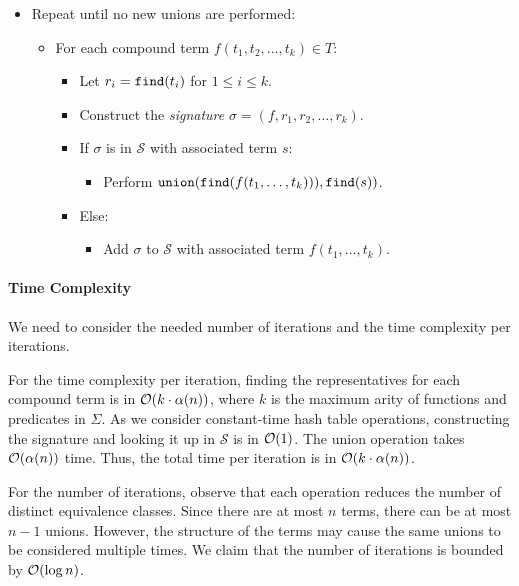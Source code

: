 \begin{itemize} \item Repeat until no new unions are performed:
  \begin{itemize} \item For each compound term $f(t_1, t_2, \dots, t_k) \in T$:
    \begin{itemize}
      \item Let $r_i = \mbox{\texttt{find}}(t_i)$ for $1 \leq i \leq k$.
      \item Construct the \emph{signature} $\sigma = (f, r_1, r_2, \dots, r_k)$.
      \item If $\sigma$ is in $\mathcal{S}$ with associated term $s$:
      \begin{itemize}
        \item Perform $\mbox{\texttt{union}}(\mbox{\texttt{find}}(f(t_1, \dots, t_k))),
        \mbox{\texttt{find}}(s))$.
      \end{itemize}
      \item Else:
      \begin{itemize}
        \item Add $\sigma$ to $\mathcal{S}$ with associated term $f(t_1, \dots, t_k)$.
      \end{itemize}
    \end{itemize}
  \end{itemize}
\end{itemize}

\paragraph{Time Complexity} We need to consider the needed number of iterations and the time complexity per iterations.

For the time complexity per iteration, finding the representatives for each
compound term is in $\mathcal{O}(k \cdot \alpha(n))$, where $k$ is the maximum arity
of functions and predicates in $\Sigma$. As we consider constant-time hash table operations,
constructing the signature and looking it up in $\mathcal{S}$ is in $\mathcal{O}(1)$. The union operation
takes $\mathcal{O}(\alpha(n))$ time. Thus, the total time per iteration is in $\mathcal{O}(k \cdot \alpha(n))$.

For the number of iterations, observe that each \union{} operation reduces the number of distinct
equivalence classes. Since there are at most $n$ terms, there can be at most $n - 1$ unions. However, the
structure of the terms may cause the same unions to be considered multiple times. We claim
that the number of iterations is bounded by $\mathcal{O}(\log n)$.

